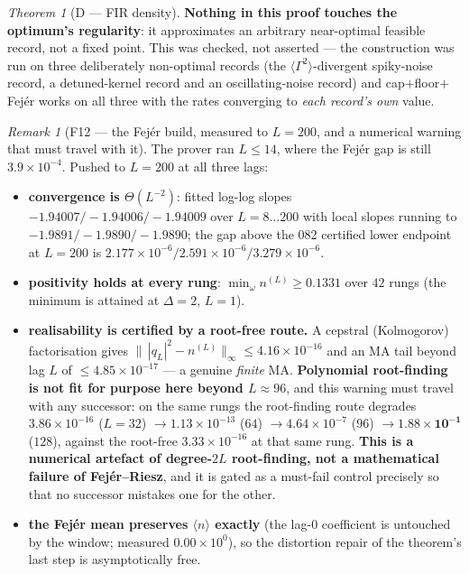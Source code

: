 \documentclass[11pt]{article}
\theoremstyle{definition}
\theoremstyle{remark}
\newtheorem{remark}{Remark}
\newtheorem{namedthm}{Theorem}
\begin{document}
\begin{namedthm}[D --- FIR density]
\medskip\noindent\textbf{Nothing in this proof touches the optimum's
regularity}: it approximates an arbitrary near-optimal feasible record, not a
fixed point. This was checked, not asserted --- the construction was run on
three deliberately non-optimal records (the $\langle\Gamma^2\rangle$-divergent
spiky-noise record, a detuned-kernel record and an oscillating-noise record)
and cap$+$floor$+$Fej\'er works on all three with the rates converging to
\emph{each record's own} value.
\end{namedthm}

\begin{remark}[F12 --- the Fej\'er build, measured to $L=200$, and a numerical
warning that must travel with it]
\label{rem:F12}
The prover ran $L\le14$, where the Fej\'er gap is still
$3.9\times10^{-4}$. Pushed to $L=200$ at all three lags:
\begin{itemize}
\item \textbf{convergence is $\Theta(L^{-2})$}: fitted log-log slopes
$-1.94007/-1.94006/-1.94009$ over $L=8\ldots200$ with local slopes running to
$-1.9891/-1.9890/-1.9890$; the gap above the 082 certified lower endpoint at
$L=200$ is $2.177\times10^{-6}/2.591\times10^{-6}/3.279\times10^{-6}$.
\item \textbf{positivity holds at every rung}: $\min_\omega n^{(L)}\ge
0.1331$ over $42$ rungs (the minimum is attained at $\Delta=2$, $L=1$).
\item \textbf{realisability is certified by a root-free route.} A cepstral
(Kolmogorov) factorisation \cite[Ch.~13]{bib:os10} gives
$\bigl\|\,|q_L|^2-n^{(L)}\bigr\|_\infty\le4.16\times10^{-16}$ and an MA tail
beyond lag $L$ of $\le4.85\times10^{-17}$ --- a genuine \emph{finite} MA.
\textbf{Polynomial root-finding is not fit for purpose here beyond $L\approx
96$}, and this warning must travel with any successor: on the same rungs the
root-finding route degrades $3.86\times10^{-16}$ ($L=32$) $\to
1.13\times10^{-13}$ ($64$) $\to4.64\times10^{-7}$ ($96$)
$\to\mathbf{1.88\times10^{-1}}$ ($128$), against the root-free
$3.33\times10^{-16}$ at that same rung. \textbf{This is a numerical artefact
of degree-$2L$ root-finding, not a mathematical failure of Fej\'er--Riesz},
and it is gated as a must-fail control precisely so that no successor mistakes
one for the other.
\item \textbf{the Fej\'er mean preserves $\langle n\rangle$ exactly} (the
lag-$0$ coefficient is untouched by the window; measured $0.00\times10^{0}$),
so the distortion repair of the theorem's last step is asymptotically free.
\end{itemize}
\end{remark}
\end{document}
